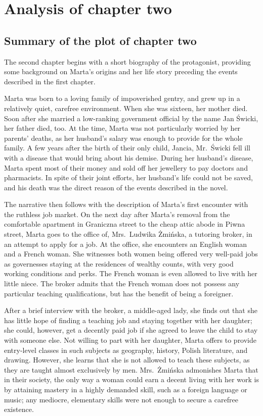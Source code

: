 \section{Analysis of chapter two}
\subsection{Summary of the plot of chapter two}

The second chapter begins with a short biography of the protagonist, providing some background on Marta's origins and her life story preceding the events described in the first chapter.

Marta was born to a loving family of impoverished gentry, and grew up in a relatively quiet, carefree environment.
When she was sixteen, her mother died.
Soon after she married a low-ranking government official by the name Jan Świcki, her father died, too.
At the time, Marta was not particularly worried by her parents' deaths, as her husband's salary was enough to provide for the whole family.
A few years after the birth of their only child, Jancia, Mr.\ Świcki fell ill with a disease that would bring about his demise.
During her husband's disease, Marta spent most of their money and sold off her jewellery to pay doctors and pharmacists.
In spite of their joint efforts, her husband's life could not be saved, and his death was the direct reason of the events described in the novel.

The narrative then follows with the description of Marta's first encounter with the ruthless job market.
On the next day after Marta's removal from the comfortable apartment in Graniczna street to the cheap attic abode in Piwna street, Marta goes to the office of, Mrs.\ Ludwika Żmińska, a tutoring broker, in an attempt to apply for a job.
At the office, she encounters an English woman and a French woman.
She witnesses both women being offered very well-paid jobs as governesses staying at the residences of wealthy counts, with very good working conditions and perks.
The French woman is even allowed to live with her little niece.
The broker admits that the French woman does not possess any particular teaching qualifications, but has the benefit of being a foreigner.

After a brief interview with the broker, a middle-aged lady, she finds out that she has little hope of finding a teaching job and staying together with her daughter; she could, however, get a decently paid job if she agreed to leave the child to stay with someone else.
Not willing to part with her daughter, Marta offers to provide entry-level classes in such subjects as geography, history, Polish literature, and drawing.
However, she learns that she is not allowed to teach these subjects, as they are taught almost exclusively by men.
Mrs.\ Żmińska admonishes Marta that in their society, the only way a woman could earn a decent living with her work is by attaining mastery in a highly demanded skill, such as a foreign language or music; any mediocre, elementary skills were not enough to secure a carefree existence.

